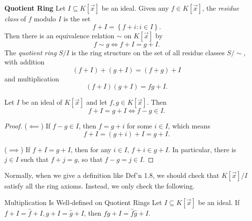 \documentclass[co439]{subfiles}
\begin{document}
    \begin{definition}{\textbf{Quotient Ring}}
        Let $I\subseteq K\left[ \vec{x} \right]$ be an ideal. Given any $f\in K\left[ \vec{x} \right]$, the \emph{residue class} of $f$ modulo $I$ is the set
        \begin{equation*}
            f+I = \left\lbrace f+i: i\in I \right\rbrace.
        \end{equation*}
        Then there is an equivalence relation $\sim$ on $K\left[ \vec{x} \right]$ by
        \begin{equation*}
            f\sim g \iff f+I = g+I.
        \end{equation*}
        The \emph{quotient ring} $S /I$ is the ring structure on the set of all residue classes $S /\sim$, with addition
        \begin{equation*}
            \left( f+I \right) + \left( g+I \right) = \left( f+g \right) + I
        \end{equation*}
        and multiplication
        \begin{equation*}
            \left( f+I \right)\left( g+I \right) = fg+I.
        \end{equation*}
    \end{definition}
    
    \begin{prop}{}
        Let $I$ be an ideal of $K\left[ \vec{x} \right]$ and let $f,g\in K\left[ \vec{x} \right]$. Then
        \begin{equation*}
            f+I = g+I \iff f-g\in I.
        \end{equation*}
    \end{prop}

    \begin{proof}
        ($\impliedby$) If $f-g\in I$, then $f=g+i$ for some $i\in I$, which means
        \begin{equation*}
            f+I = \left( g+i \right)+I = g+I.
        \end{equation*}

        ($\implies$) If $f+I=g+I$, then for any $i\in I$, $f+i\in g+I$. In particular, there is $j\in I$ such that $f+j=g$, so that $f-g = j\in I$.
    \end{proof}

    \np Normally, when we give a definition like Def'n 1.8, we should check that $K\left[ \vec{x} \right] /I$ satisfy all the ring axioms. Instead, we only check the following.
    
    \begin{prop}{Multiplication Is Well-defined on Quotient Rings}
        Let $I\subseteq K\left[ \vec{x} \right]$ be an ideal. If $f+I=\hat{f}+I, g+I=\hat{g}+I$, then $fg+I = \hat{f}\hat{g}+I$.
    \end{prop}
\end{document}
